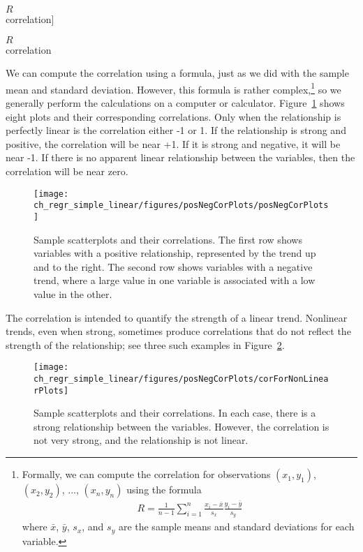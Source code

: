 $R$\\\footnotesize correlation]{\raggedright\vspace{-11.5mm}

$R$\\\footnotesize correlation}

We can compute the correlation using a formula, just as we did with the sample mean and standard deviation. However, this formula is rather complex,\footnote{Formally, we can compute the correlation for observations $(x_1, y_1)$, $(x_2, y_2)$, ..., $(x_n, y_n)$ using the formula
\begin{eqnarray*}
R = \frac{1}{n-1}\sum_{i=1}^{n} \frac{x_i-\bar{x}}{s_x}\frac{y_i-\bar{y}}{s_y}
\end{eqnarray*}
where $\bar{x}$, $\bar{y}$, $s_x$, and $s_y$ are the sample means and standard deviations for each variable.} so we generally perform the calculations on a computer or calculator. Figure~\ref{posNegCorPlots} shows eight plots and their corresponding correlations. Only when the relationship is perfectly linear is the correlation either -1 or 1. If the relationship is strong and positive, the correlation will be near +1. If it is strong and negative, it will be near -1. If there is no apparent linear relationship between the variables, then the correlation will be near zero.

\begin{figure}
   \centering
   \texttt{[image: ch\_regr\_simple\_linear/figures/posNegCorPlots/posNegCorPlots]}
   \caption{Sample scatterplots and their correlations. The first row shows variables with a positive relationship, represented by the trend up and to the right. The second row shows variables with a negative trend, where a large value in one variable is associated with a low value in the other.}
   \label{posNegCorPlots}
\end{figure}

The correlation is intended to quantify the strength of a linear trend. Nonlinear trends, even when strong, sometimes produce correlations that do not reflect the strength of the relationship; see three such examples in Figure~\ref{corForNonLinearPlots}.

\begin{figure}
   \centering
   \texttt{[image: ch\_regr\_simple\_linear/figures/posNegCorPlots/corForNonLinearPlots]}
   \caption{Sample scatterplots and their correlations. In each case, there is a strong relationship between the variables. However, the correlation is not very strong, and the relationship is not linear.}
   \label{corForNonLinearPlots}
\end{figure}

